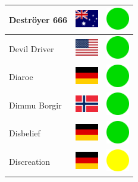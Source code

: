 \documentclass[12pt, a4paper, twoside]{report}
\begin{document}
\begin{center}
\begin{longtable}{|p{5cm}|p{2cm}|p{2cm}|}
Deströyer 666 & \includegraphics[width=1cm]{4x3/au} & \includegraphics[width=1cm]{likes/y} \\ \hline
Devil Driver & \includegraphics[width=1cm]{4x3/us} & \includegraphics[width=1cm]{likes/y} \\ \hline
Diaroe & \includegraphics[width=1cm]{4x3/de} & \includegraphics[width=1cm]{likes/y} \\ \hline
Dimmu Borgir & \includegraphics[width=1cm]{4x3/no} & \includegraphics[width=1cm]{likes/y} \\ \hline
Disbelief & \includegraphics[width=1cm]{4x3/de} & \includegraphics[width=1cm]{likes/y} \\ \hline
Discreation & \includegraphics[width=1cm]{4x3/de} & \includegraphics[width=1cm]{likes/m} \\ \hline

\end{longtable}
\end{center}
\end{document}
